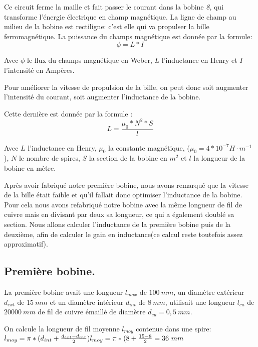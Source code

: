 Ce circuit ferme la maille et fait passer le courant dans la
bobine \emph{8}, qui transforme l'énergie électrique en champ
magnétique. La ligne de champ au milieu de la bobine est
rectiligne: c'est elle qui va propulser la bille
ferromagnétique. La puissance du champs magnétique est donnée
par la formule:
\begin{equation}
	\phi = L*I
\end{equation}

Avec $\phi$ le flux du champs magnétique en Weber, $L$ l'inductance
en Henry et $I$ l'intensité en Ampères.

Pour améliorer la vitesse de propulsion de la bille, on peut
donc soit   augmenter l'intensité du courant, soit augmenter
l'inductance de la   bobine.

Cette dernière est donnée par la formule :
\begin{equation}
	L=\frac{\mu_0*N^2*S}{l}
\end{equation}

Avec $L$ l'inductance en Henry, $\mu_0$ la constante magnétique, ($\mu_0=4*10^{-7} H·m^{-1}$ ), $N$ le nombre de
spires, $S$ la section de la bobine en $m^2$ et $l$   la longueur de
la bobine en mètre.

Après avoir fabriqué notre première bobine, nous avons remarqué
que   la vitesse de la bille était faible et qu'il fallait donc
optimiser   l'inductance de la bobine. Pour cela nous avons
refabriqué notre bobine   avec la même longueur de fil de
cuivre mais en divisant par deux sa   longueur, ce qui a
également doublé sa section. Nous allons calculer
l'inductance de la première bobine puis de la deuxième, afin de
calculer   le gain en inductance(ce calcul reste toutefois
assez approximatif).

\subsection{Première bobine.}
La première bobine avait une longueur $l_{max}$ de $100\ mm$, un
diamètre   extérieur $d_{ext}$ de $15\ mm$ et un diamètre intérieur
$d_{int}$ de $8\ mm$,   utilisait une longueur $l_{cu}$ de $20000\ mm$ de fil
de cuivre émaillé de   diamètre $d_{cu}=0,5\ mm$.

On calcule la longueur de fil moyenne $l_{moy}$ contenue dans une
spire: \\
\begin{math}
	l_{moy}= \pi*(d_{int}+\frac{d_{ext}-d_{int}}{2}) \\
	l_{moy}=\pi*(8+\frac{15-8}{2}=36\ mm
\end{math}

